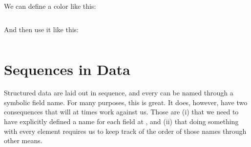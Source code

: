 \subsubsection{\csharp}


We can define a color like this:

\inputminted[firstline=4]{csharp}{../src/csharp/primdata/colorstruct/Program.cs}

And then use it like this:

\inputminted[lastline=2]{csharp}{../src/csharp/primdata/colorstruct/Program.cs}

\section{Sequences in Data}

Structured data are laid out in sequence, and every  can be named through a symbolic field name. For many purposes, this is great. It does, however, have two consequences that will at times work against us. Those are (i) that we need to have explicitly defined a name for each field at , and (ii) that doing something with every element requires us to keep track of the order of those names through other means.

